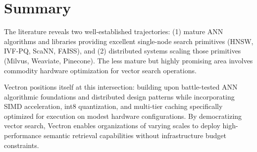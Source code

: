 \section{Summary}
The literature reveals two well-established trajectories: (1) mature ANN algorithms and libraries providing excellent single-node search primitives (HNSW, IVF-PQ, ScaNN, FAISS), and (2) distributed systems scaling those primitives (Milvus, Weaviate, Pinecone). The less mature but highly promising area involves commodity hardware optimization for vector search operations.

Vectron positions itself at this intersection: building upon battle-tested ANN algorithmic foundations and distributed design patterns while incorporating SIMD acceleration, int8 quantization, and multi-tier caching specifically optimized for execution on modest hardware configurations. By democratizing vector search, Vectron enables organizations of varying scales to deploy high-performance semantic retrieval capabilities without infrastructure budget constraints.